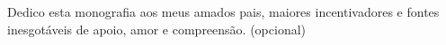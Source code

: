 \begin{dedicatoria}
   \vspace*{\fill}
   \begin{flushright} 
        \parbox{0.6\linewidth}{
		 {
		Dedico esta monografia aos meus amados pais, maiores incentivadores e fontes inesgotáveis de apoio, amor e compreensão. (opcional)
		}
		}
   \end{flushright} 
   \vspace{2cm}
	 
\end{dedicatoria}